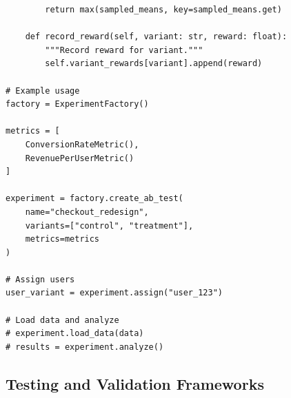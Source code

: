 \begin{lstlisting}
        return max(sampled_means, key=sampled_means.get)

    def record_reward(self, variant: str, reward: float):
        """Record reward for variant."""
        self.variant_rewards[variant].append(reward)

# Example usage
factory = ExperimentFactory()

metrics = [
    ConversionRateMetric(),
    RevenuePerUserMetric()
]

experiment = factory.create_ab_test(
    name="checkout_redesign",
    variants=["control", "treatment"],
    metrics=metrics
)

# Assign users
user_variant = experiment.assign("user_123")

# Load data and analyze
# experiment.load_data(data)
# results = experiment.analyze()
\end{lstlisting}

\subsection{Testing and Validation Frameworks}

